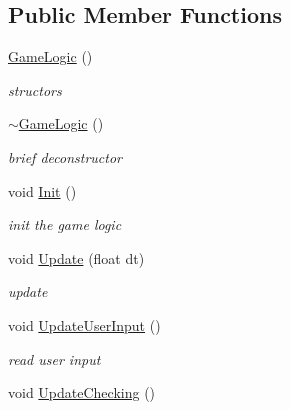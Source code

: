 \subsection*{Public Member Functions}
\begin{DoxyCompactItemize}
\item 
\hypertarget{class_game_logic_a996cd781691c36922e7ce792fcb21640}{\hyperlink{class_game_logic_a996cd781691c36922e7ce792fcb21640}{Game\-Logic} ()}\label{class_game_logic_a996cd781691c36922e7ce792fcb21640}

\begin{DoxyCompactList}\small\item\em structors \end{DoxyCompactList}\item 
\hypertarget{class_game_logic_a63a7acf778535b5f74d469de2cd39b16}{\hyperlink{class_game_logic_a63a7acf778535b5f74d469de2cd39b16}{$\sim$\-Game\-Logic} ()}\label{class_game_logic_a63a7acf778535b5f74d469de2cd39b16}

\begin{DoxyCompactList}\small\item\em brief deconstructor \end{DoxyCompactList}\item 
\hypertarget{class_game_logic_ad81dfbe0828fde579f4ea141593dfdcf}{void \hyperlink{class_game_logic_ad81dfbe0828fde579f4ea141593dfdcf}{Init} ()}\label{class_game_logic_ad81dfbe0828fde579f4ea141593dfdcf}

\begin{DoxyCompactList}\small\item\em init the game logic \end{DoxyCompactList}\item 
\hypertarget{class_game_logic_a400a37d0408e6032e04cc9fb2ad1447e}{void \hyperlink{class_game_logic_a400a37d0408e6032e04cc9fb2ad1447e}{Update} (float dt)}\label{class_game_logic_a400a37d0408e6032e04cc9fb2ad1447e}

\begin{DoxyCompactList}\small\item\em update \end{DoxyCompactList}\item 
\hypertarget{class_game_logic_aed261149fb612d29346ff2e18bf85b8d}{void \hyperlink{class_game_logic_aed261149fb612d29346ff2e18bf85b8d}{Update\-User\-Input} ()}\label{class_game_logic_aed261149fb612d29346ff2e18bf85b8d}

\begin{DoxyCompactList}\small\item\em read user input \end{DoxyCompactList}\item 
\hypertarget{class_game_logic_a546c524265b0af4a374b4d04694f902c}{void \hyperlink{class_game_logic_a546c524265b0af4a374b4d04694f902c}{Update\-Checking} ()}\label{class_game_logic_a546c524265b0af4a374b4d04694f902c}


\end{DoxyCompactItemize}
